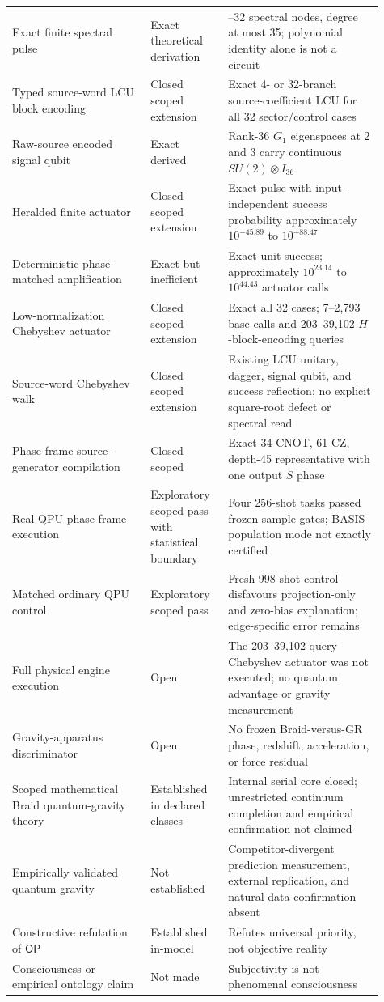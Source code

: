 \documentclass[11pt]{article}
\theoremstyle{definition}
\theoremstyle{remark}
\newcommand{\OPT}{\mathsf{OP}}
\begin{document}
\begin{longtable}{>{\raggedright\arraybackslash}p{0.34\linewidth} >{\raggedright\arraybackslash}p{0.19\linewidth} >{\raggedright\arraybackslash}p{0.38\linewidth}}
Exact finite spectral pulse & Exact theoretical derivation & 15--32 spectral nodes, degree at most 35; polynomial identity alone is not a circuit \\
Typed source-word LCU block encoding & Closed scoped extension & Exact 4- or 32-branch source-coefficient LCU for all 32 sector/control cases \\
Raw-source encoded signal qubit & Exact derived & Rank-36 $G_1$ eigenspaces at 2 and 3 carry continuous $SU(2)\otimes I_{36}$ \\
Heralded finite actuator & Closed scoped extension & Exact pulse with input-independent success probability approximately $10^{-45.89}$ to $10^{-88.47}$ \\
Deterministic phase-matched amplification & Exact but inefficient & Exact unit success; approximately $10^{23.14}$ to $10^{44.43}$ actuator calls \\
Low-normalization Chebyshev actuator & Closed scoped extension & Exact all 32 cases; 7--2,793 base calls and 203--39,102 $H$-block-encoding queries \\
Source-word Chebyshev walk & Closed scoped extension & Existing LCU unitary, dagger, signal qubit, and success reflection; no explicit square-root defect or spectral read \\
Phase-frame source-generator compilation & Closed scoped & Exact 34-CNOT, 61-CZ, depth-45 representative with one output $S$ phase \\
Real-QPU phase-frame execution & Exploratory scoped pass with statistical boundary & Four 256-shot tasks passed frozen sample gates; BASIS population mode not exactly certified \\
Matched ordinary QPU control & Exploratory scoped pass & Fresh 998-shot control disfavours projection-only and zero-bias explanation; edge-specific error remains \\
Full physical engine execution & Open & The 203--39,102-query Chebyshev actuator was not executed; no quantum advantage or gravity measurement \\
Gravity-apparatus discriminator & Open & No frozen Braid-versus-GR phase, redshift, acceleration, or force residual \\
Scoped mathematical Braid quantum-gravity theory & Established in declared classes & Internal serial core closed; unrestricted continuum completion and empirical confirmation not claimed \\
Empirically validated quantum gravity & Not established & Competitor-divergent prediction measurement, external replication, and natural-data confirmation absent \\
Constructive refutation of $\OPT$ & Established in-model & Refutes universal priority, not objective reality \\
Consciousness or empirical ontology claim & Not made & Subjectivity is not phenomenal consciousness \\
\bottomrule
\end{longtable}
\end{document}
